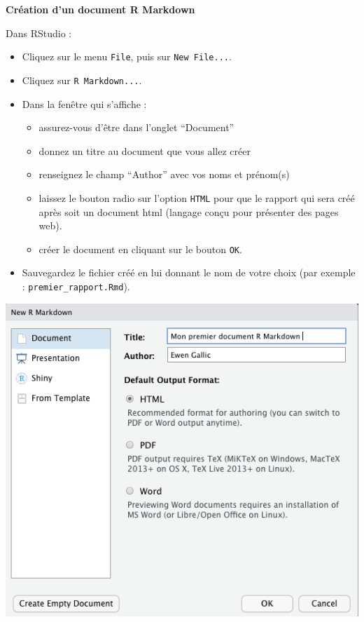 \documentclass[
  11pt,
]{book}
\providecommand{\tightlist}{%
  \setlength{\itemsep}{0pt}\setlength{\parskip}{0pt}}
\numberwithin{equation}{section}
\numberwithin{countremarque}{section}
\newenvironment{greenbox}{
  \begin{tcolorbox}[breakable, colback=vert,coltext=black,
                  colframe=grisfonce]}
 {\end{tcolorbox}}
\begin{document}
\begin{greenbox}

\textbf{Création d'un document R Markdown}

Dans RStudio :

\begin{itemize}
\item
  Cliquez sur le menu \texttt{File}, puis sur \texttt{New\ File...}.
\item
  Cliquez sur \texttt{R\ Markdown...}.
\item
  Dans la fenêtre qui s'affiche :

  \begin{itemize}
  \tightlist
  \item
    assurez-vous d'être dans l'onglet ``Document''
  \item
    donnez un titre au document que vous allez créer
  \item
    renseignez le champ ``Author'' avec vos noms et prénom(s)
  \item
    laissez le bouton radio sur l'option \texttt{HTML} pour que le rapport qui sera créé après soit un document html (langage conçu pour présenter des pages web).
  \item
    créer le document en cliquant sur le bouton \texttt{OK}.
  \end{itemize}
\item
  Sauvegardez le fichier créé en lui donnant le nom de votre choix (par exemple : \texttt{premier\_rapport.Rmd}).
\end{itemize}

\begin{center}\includegraphics[width=0.75\linewidth]{figs/creation_markdown} \end{center}

\end{greenbox}
\end{document}

